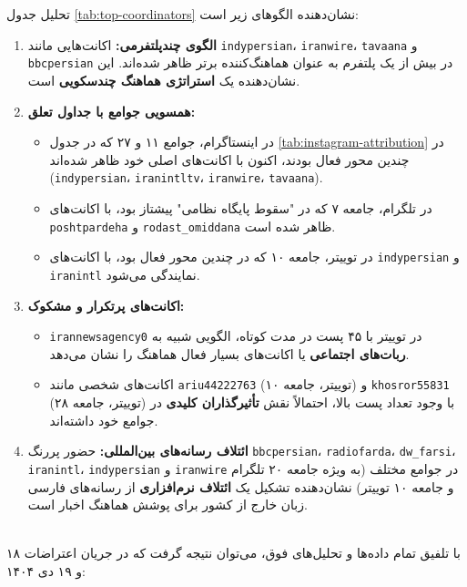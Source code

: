\documentclass{article}
\begin{document}
	تحلیل جدول \ref{tab:top-coordinators} نشان‌دهنده الگوهای زیر است:
	
	\begin{enumerate}
		\item \textbf{الگوی چندپلتفرمی:} اکانت‌هایی مانند \texttt{indypersian}، \texttt{iranwire}، \texttt{tavaana} و \texttt{bbcpersian} در بیش از یک پلتفرم به عنوان هماهنگ‌کننده برتر ظاهر شده‌اند. این نشان‌دهنده یک \textbf{استراتژی هماهنگ چندسکویی} است.
		
		\item \textbf{همسویی جوامع با جداول تعلق:} 
		\begin{itemize}
			\item در اینستاگرام، جوامع ۱۱ و ۲۷ که در جدول \ref{tab:instagram-attribution} در چندین محور فعال بودند، اکنون با اکانت‌های اصلی خود ظاهر شده‌اند (\texttt{indypersian}، \texttt{iranintltv}، \texttt{iranwire}، \texttt{tavaana}).
			\item در تلگرام، جامعه ۷ که در "سقوط پایگاه نظامی" پیشتاز بود، با اکانت‌های \texttt{poshtpardeha} و \texttt{rodast\_omiddana} ظاهر شده است.
			\item در توییتر، جامعه ۱۰ که در چندین محور فعال بود، با اکانت‌های \texttt{indypersian} و \texttt{iranintl} نمایندگی می‌شود.
		\end{itemize}
		
		\item \textbf{اکانت‌های پرتکرار و مشکوک:} 
		\begin{itemize}
			\item \texttt{irannewsagency0} در توییتر با ۴۵ پست در مدت کوتاه، الگویی شبیه به \textbf{ربات‌های اجتماعی} یا اکانت‌های بسیار فعال هماهنگ را نشان می‌دهد.
			\item اکانت‌های شخصی مانند \texttt{ariu44222763} (توییتر، جامعه ۱۰) و \texttt{khosror55831} (توییتر، جامعه ۲۸) با وجود تعداد پست بالا، احتمالاً نقش \textbf{تأثیرگذاران کلیدی} در جوامع خود داشته‌اند.
		\end{itemize}
		
		\item \textbf{ائتلاف رسانه‌های بین‌المللی:} حضور پررنگ \texttt{bbcpersian}، \texttt{radiofarda}، \texttt{dw\_farsi}، \texttt{iranintl}، \texttt{indypersian} و \texttt{iranwire} در جوامع مختلف (به ویژه جامعه ۲۰ تلگرام و جامعه ۱۰ توییتر) نشان‌دهنده تشکیل یک \textbf{ائتلاف نرم‌افزاری} از رسانه‌های فارسی زبان خارج از کشور برای پوشش هماهنگ اخبار است.
	\end{enumerate}
	\\
با تلفیق تمام داده‌ها و تحلیل‌های فوق، می‌توان نتیجه گرفت که در جریان اعتراضات ۱۸ و ۱۹ دی ۱۴۰۴:
\end{document}

